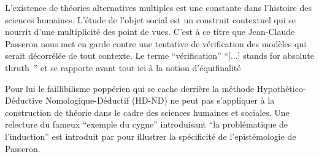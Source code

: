 
L’existence de théories alternatives multiples est une constante dans l’histoire des sciences humaines. L'étude de l'objet social est un construit contextuel qui se nourrit d'une multiplicité des point de vues. C'est à ce titre que Jean-Claude Passeron \autocite{Passeron2006} nous met en garde contre une tentative de vérification des modèles qui serait décorrélée de tout contexte. Le terme \enquote{vérification} \foreignquote{english}{[...] stands for absolute thruth } \autocites{David2009, Oreskes1994} et se rapporte avant tout ici à la notion d'équifinalité \autocite{OSullivan2004} 

Pour lui le faillibilisme poppérien qui se cache derrière la méthode Hypothético-Déductive Nomologique-Déductif (HD-ND) ne peut pas s'appliquer à la construction de théorie dans le cadre des sciences humaines et sociales. Une relecture du fameux \enquote{exemple du cygne} introduisant \enquote{la problématique de l'induction} est introduit par \cite{Allard2000} pour illustrer la spécificité de l'epistémologie de Passeron.

